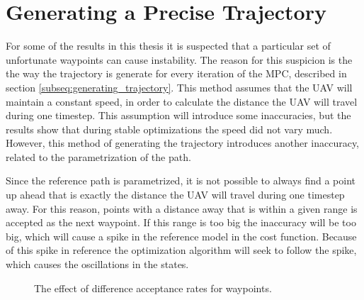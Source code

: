 \section{Generating a Precise Trajectory}

For some of the results in this thesis it is suspected that a particular set of unfortunate waypoints can cause instability. The reason for this suspicion is the the way the trajectory is generate for every iteration of the MPC, described in section \ref{subseq:generating_trajectory}. This method assumes that the UAV will maintain a constant speed, in order to calculate the distance the UAV will travel during one timestep. This assumption will introduce some inaccuracies, but the results show that during stable optimizations the speed did not vary much. However, this method of generating the trajectory introduces another inaccuracy, related to the parametrization of the path.

Since the reference path is parametrized, it is not possible to always find a point up ahead that is exactly the distance the UAV will travel during one timestep away. For this reason, points with a distance away that is within a given range is accepted as the next waypoint. If this range is too big the inaccuracy will be too big, which will cause a spike in the reference model in the cost function. Because of this spike in reference the optimization algorithm will seek to follow the spike, which causes the oscillations in the states.

\begin{figure}[]
	\centering
	\caption{The effect of difference acceptance rates for waypoints.}
	\label{fig:oscillating_attitude}
\end{figure}


